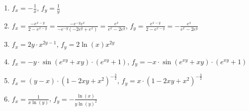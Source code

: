 \item
\begin{enumerate}
\item $f_x = -\frac{1}{x}$, $f_y = \frac{1}{y}$
\item $f_x = \frac{-e^{x-y}}{2-e^{x-y}} = \frac{-e^{-y}e^x}{-e^{-y}(-2e^y+e^x)} = \frac{e^x}{e^x-2e^y}$, $f_y = \frac{e^{x-y}}{2-e^{x-y}} = -\frac{e^x}{e^x-2e^y}$
\item $f_x = 2y\cdot x^{2y-1}$, $f_y = 2\ln(x)x^{2y}$
\item $f_x = -y \cdot \sin(e^{xy}+xy) \cdot (e^{xy}+1)$, $f_y = -x \cdot \sin(e^{xy}+xy) \cdot (e^{xy}+1)$ 
\item $f_x = (y-x) \cdot (1-2xy+x^2)^{-\frac{3}{2}}$, $f_y = x \cdot (1-2xy+x^2)^{-\frac{3}{2}}$
\item $f_x = \frac{1}{x\ln(y)}$, $f_y=-\frac{\ln(x)}{y\ln(y)^2}$
\end{enumerate}


